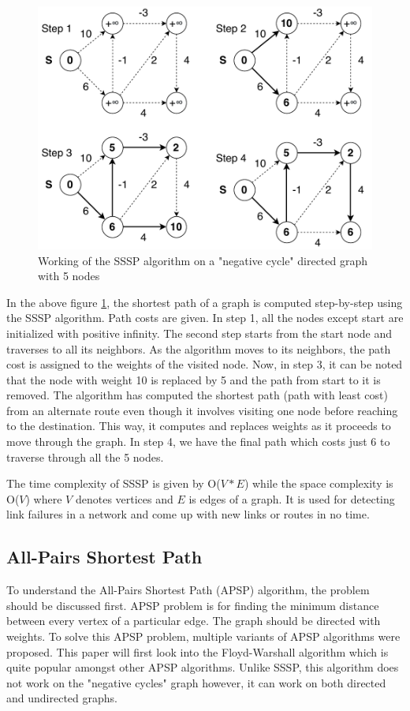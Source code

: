 \documentclass[journal,twoside,web]{ieeecolor}
\begin{document}
\begin{figure}[!h]
    \centerline{\includegraphics[scale=0.55]{figures/sssp.pdf}}
    \caption{Working of the SSSP algorithm on a "negative cycle" directed graph with 5 nodes}
    \label{fig2}
\end{figure}

In the above figure \ref{fig2}, the shortest path of a graph is computed step-by-step using the SSSP algorithm. Path costs are given. In step 1, all the nodes except start are initialized with positive infinity. The second step starts from the start node and traverses to all its neighbors. As the algorithm moves to its neighbors, the path cost is assigned to the weights of the visited node. Now, in step 3, it can be noted that the node with weight 10 is replaced by 5 and the path from start to it is removed. The algorithm has computed the shortest path (path with least cost) from an alternate route even though it involves visiting one node before reaching to the destination. This way, it computes and replaces weights as it proceeds to move through the graph. In step 4, we have the final path which costs just 6 to traverse through all the 5 nodes.

The time complexity of SSSP is given by O($V*E$) while the space complexity is O($V$) where $V$ denotes vertices and $E$ is edges of a graph. It is used for detecting link failures in a network and come up with new links or routes in no time.

\subsection{All-Pairs Shortest Path}
To understand the All-Pairs Shortest Path (APSP) algorithm, the problem should be discussed first. APSP problem is for finding the minimum distance between every vertex of a particular edge. The graph should be directed with weights. To solve this APSP problem, multiple variants of APSP algorithms were proposed\cite{43, 44, 45, 46}. This paper will first look into the Floyd-Warshall algorithm which is quite popular amongst other APSP algorithms. Unlike SSSP, this algorithm does not work on the "negative cycles" graph however, it can work on both directed and undirected graphs.
\end{document}

